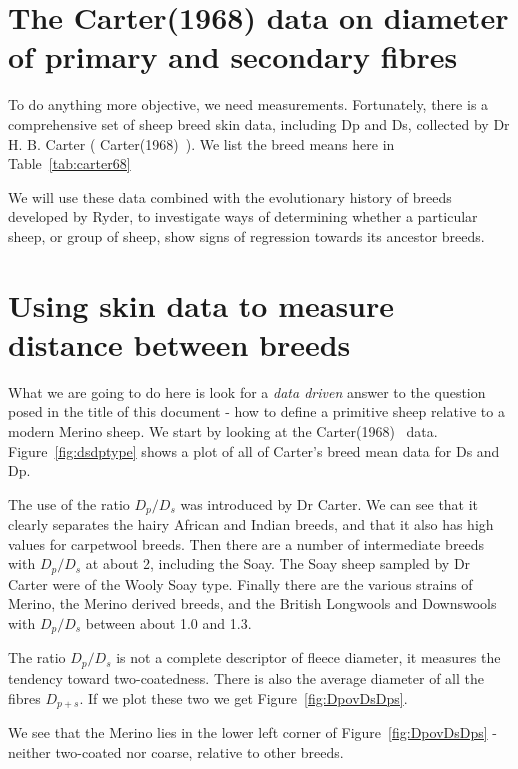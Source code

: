 \documentclass[titlepage]{article}  %
\begin{document}
\section{The Carter(1968) data on diameter of primary and secondary fibres}
To do anything more objective, we need measurements. Fortunately, there is a comprehensive set of sheep breed skin data, including Dp and Ds, collected by Dr H. B. Carter ( Carter(1968)~\cite{cart:68}). We list the breed means here in Table~\ref{tab:carter68}

We will use these data  combined with the evolutionary history of breeds developed by Ryder, to investigate ways of determining whether a particular sheep, or group of sheep, show signs of regression towards its ancestor breeds.

\section{Using skin data to measure distance between breeds}
What we are going to do here is look for a {\em data driven} answer to the question posed in the title of this document - how to define a primitive sheep relative to a modern Merino sheep. We start by looking at the Carter(1968)~\cite{cart:68} data. Figure~\ref{fig:dsdptype} shows a plot of all of Carter's breed mean data for Ds and Dp.

The use of the ratio $D_{p}/D_{s}$ was introduced by Dr Carter. We can see that it clearly separates the hairy African and Indian breeds, and that it also has high values for carpetwool breeds. Then there are a number of intermediate breeds with $D_{p}/D_{s}$ at about 2, including the Soay. The Soay sheep sampled by Dr Carter were of the Wooly Soay type. Finally there are the various strains of Merino, the Merino derived breeds, and the British Longwools and Downswools with $D_{p}/D_{s}$ between about 1.0 and 1.3. 

The ratio $D_{p}/D_{s}$ is not a complete descriptor of fleece diameter, it measures the tendency toward two-coatedness. There is also the average diameter of all the fibres $D_{p+s}$.  If we plot these two we get Figure~\ref{fig:DpovDsDps}.

We see that the Merino lies in the lower left corner of Figure~\ref{fig:DpovDsDps} - neither two-coated nor coarse, relative to other breeds.
\end{document}
